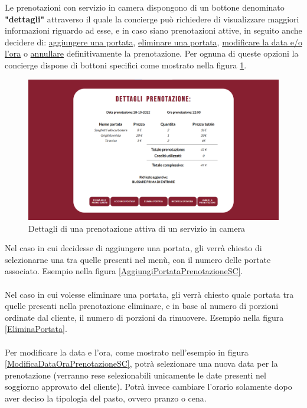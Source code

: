 \documentclass [a4paper, 12pt]{book}
\begin{document}
Le prenotazioni con servizio in camera dispongono di un bottone denominato \textbf{"dettagli"} attraverso il quale la concierge può richiedere di visualizzare maggiori informazioni riguardo ad esse, e in caso siano prenotazioni attive, in seguito anche decidere di: \underline{aggiungere una portata}, \underline{eliminare una portata}, \underline{modificare la data e/o l'ora} o \underline{annullare} definitivamente la prenotazione. Per ognuna di queste opzioni la concierge dispone di bottoni specifici come mostrato nella figura \ref{DettagliPrenotazioneSCStaff}.
\begin{figure}[h]
\centering
\includegraphics[scale=0.25]{DettagliPrenotazioneSCStaff.png}
\caption{Dettagli di una prenotazione attiva di un servizio in camera}
\label{DettagliPrenotazioneSCStaff}\pagebreak
\end{figure}
Nel caso in cui decidesse di aggiungere una portata, gli verrà chiesto di selezionarne una tra quelle presenti nel menù, con il numero delle portate associato. Esempio nella figura \ref{AggiungiPortataPrenotazioneSC}.\\\\
Nel caso in cui volesse eliminare una portata, gli verrà chiesto quale portata tra quelle presenti nella prenotazione eliminare, e in base al numero di porzioni ordinate dal cliente, il numero di porzioni da rimuovere. Esempio nella figura \ref{EliminaPortata}.\\\\
Per modificare la data e l'ora, come mostrato nell'esempio in figura \ref{ModificaDataOraPrenotazioneSC}, potrà selezionare una nuova data per la prenotazione (verranno rese selezionabili unicamente le date presenti nel soggiorno approvato del cliente). Potrà invece cambiare l'orario solamente dopo aver deciso la tipologia del pasto, ovvero pranzo o cena.\\\\
\end{document}
